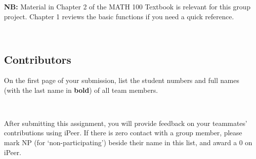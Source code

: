\documentclass[answers,addpoints]{exam}
\begin{document}
{\bf NB:} Material in Chapter 2 of the MATH 100 Textbook is relevant for this group project. Chapter 1 reviews the basic functions if you need a quick reference.

\
\subsection*{Contributors}

On the first page of your submission, list the student numbers and full names (with the last name in \textbf{bold}) of all team members.

\

After submitting this assignment, you will provide feedback on your teammates' contributions using iPeer. If there is zero contact with a group member, please mark NP (for `non-participating') beside their name in this list, and award a 0 on iPeer.
\

\hrulefill

\
\end{document}
